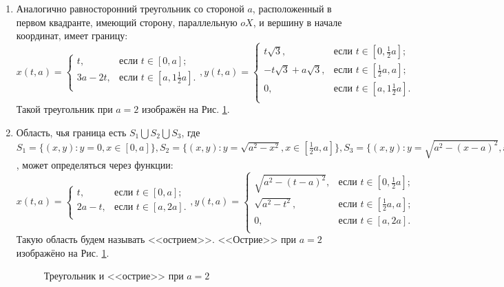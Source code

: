 \documentclass[a4paper]{article}
\begin{document}
\begin{enumerate}
    \item Аналогично равносторонний треугольник со стороной $a$, расположенный в первом квадранте, имеющий сторону, параллельную $oX$, и вершину в начале координат, имеет границу:
    \[
        x(t,a) =
        \begin{cases}
        t, & \text{если $t \in [0,a]$;} \\
        3a-2t, & \text{если $t \in [a,1\frac{1}{2}a]$.} \\
        \end{cases},
        y(t,a) =
        \begin{cases}
        t \sqrt{3}, & \text{если $t \in [0,\frac{1}{2}a]$;} \\
        -t \sqrt{3}+a\sqrt{3}, & \text{если $t \in [\frac{1}{2}a,a]$;} \\
        0, & \text{если $t \in [a,1\frac{1}{2}a]$.} \\
        \end{cases}
        \]
        Такой треугольник при $a=2$ изображён на Рис. \ref{tros}.

    \item Область, чья граница есть $S_1 \bigcup S_2 \bigcup S_3$, где $S_1=\{(x,y): y=0, x \in [0, a]\},S_2=\{(x,y): y=\sqrt{a^2-x^2}, x \in [\frac{1}{2}a, a]\},S_3=\{(x,y): y=\sqrt{a^2-(x-a)^2}, x \in [0,\frac{1}{2} a]\}$, может определяться через функции:       
    \[
        x(t,a) =
        \begin{cases}
        t, & \text{если $t \in [0,a]$;} \\
        2a-t, & \text{если $t \in [a,2a]$.} \\
        \end{cases},
        y(t,a) =
        \begin{cases}
        \sqrt{a^2-(t-a)^2}, & \text{если $t \in [0,\frac{1}{2}a]$;} \\
        \sqrt{a^2-t^2}, & \text{если $t \in [\frac{1}{2}a,a]$;} \\
        0, & \text{если $t \in [a,2a]$.} \\
        \end{cases}
        \]
        Такую область будем называть <<острием>>. <<Острие>> при $a=2$ изображёно на Рис. \ref{tros}.
        
        \begin{figure}[h!]
          \noindent{}
          \caption{Треугольник и <<острие>> при $a=2$}
          \label{tros}
          \end{figure}  
\end{enumerate}
\end{document}

